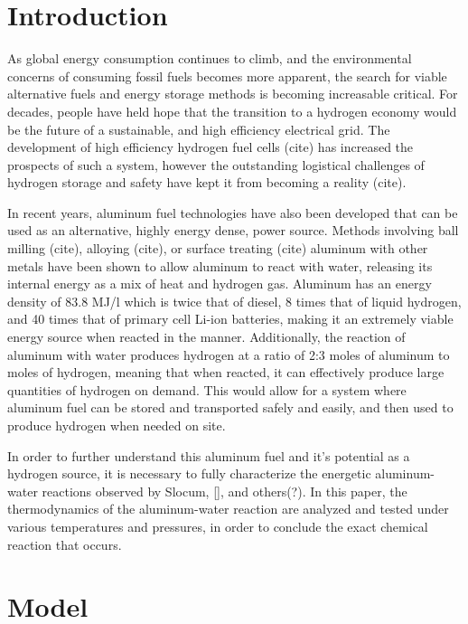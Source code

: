 \documentclass[preprint,12pt,3p]{elsarticle}
\begin{document}
\section{Introduction}
\label{introduction}


As global energy consumption continues to climb, and the environmental concerns
of consuming fossil fuels becomes more apparent, the search for viable
alternative fuels and energy storage methods is becoming increasable critical.
For decades, people have held hope that the transition to a hydrogen economy
would be the future of a sustainable, and high efficiency electrical grid. The
development of high efficiency hydrogen fuel cells (cite) has increased the
prospects of such a system, however the outstanding logistical challenges of
hydrogen storage and safety have kept it from becoming a reality (cite). 

In recent years, aluminum fuel technologies have also been developed that can be
used as an alternative, highly energy dense, power source. Methods involving
ball milling (cite), alloying (cite), or surface treating (cite) aluminum with
other metals have been shown to allow aluminum to react with water, releasing
its internal energy as a mix of heat and hydrogen gas. Aluminum has an energy
density of 83.8 MJ/l which is twice that of diesel, 8 times that of liquid
hydrogen, and 40 times that of primary cell Li-ion batteries, making it an
extremely viable energy source when reacted in the manner. Additionally, the
reaction of aluminum with water produces hydrogen at a ratio of 2:3 moles of
aluminum to moles of hydrogen, meaning that when reacted, it can effectively
produce large quantities of hydrogen on demand. This would allow for a system
where aluminum fuel can be stored and transported safely and easily, and then
used to produce hydrogen when needed on site. 

In order to further understand this aluminum fuel and it’s potential as a
hydrogen source, it is necessary to fully characterize the energetic
aluminum-water reactions observed by Slocum, [], and others(?). In this paper,
the thermodynamics of the aluminum-water reaction are analyzed and tested under
various temperatures and pressures, in order to conclude the exact chemical
reaction that occurs.


\section{Model}
\label{model}
\end{document}
